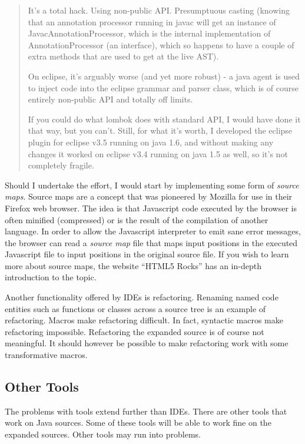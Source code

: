 \begin{quote}
  It's a total hack. Using non-public API. Presumptuous casting (knowing that an
  annotation processor running in javac will get an instance of
  JavacAnnotationProcessor, which is the internal implementation of
  AnnotationProcessor (an interface), which so happens to have a couple of extra
  methods that are used to get at the live AST).

  On eclipse, it's arguably worse (and yet more robust) - a java agent is used
  to inject code into the eclipse grammar and parser class, which is of course
  entirely non-public API and totally off limits.

  If you could do what lombok does with standard API, I would have done it that
  way, but you can't. Still, for what it's worth, I developed the eclipse plugin
  for eclipse v3.5 running on java 1.6, and without making any changes it worked
  on eclipse v3.4 running on java 1.5 as well, so it's not completely fragile.
\end{quote}

Should I undertake the effort, I would start by implementing some form of
\emph{source maps}. Source maps are a concept that was pioneered by Mozilla
\cite{source_maps_home} for use in their Firefox web browser. The idea is that
Javascript code executed by the browser is often minified (compressed) or is the
result of the compilation of another language. In order to allow the Javascript
interpreter to emit sane error messages, the browser can read a \emph{source
  map} file that maps input positions in the executed Javascript file to input
positions in the original source file. If you wish to learn more about source
maps, the website ``HTML5 Rocks'' has an in-depth introduction to the
topic. \cite{source_maps_expl}

Another functionality offered by IDEs is refactoring. Renaming named code
entities such as functions or classes across a source tree is an example of
refactoring. Macros make refactoring difficult. In fact, syntactic macros make
refactoring impossible. Refactoring the expanded source is of course not
meaningful. It should however be possible to make refactoring work with some
transformative macros.

\subsection{Other Tools}

The problems with tools extend further than IDEs. There are other tools that
work on Java sources. Some of these tools will be able to work fine on the
expanded sources. Other tools may run into problems.

